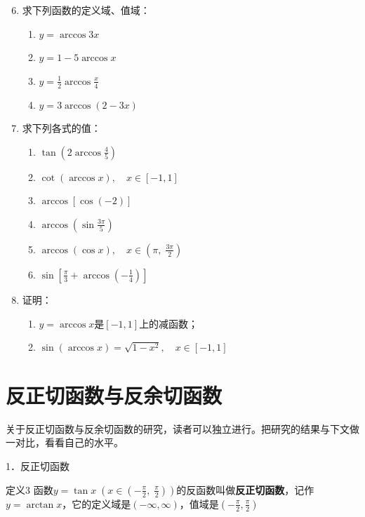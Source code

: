 \begin{enumerate}\setcounter{enumi}{5}
    \item 求下列函数的定义域、值域：
\begin{multicols}{2}
\begin{enumerate}[(1)]
    \item $y=\arccos 3x$
    \item $y=1-5\arccos x$
    \item $y=\frac{1}{2}\arccos\frac{x}{4}$
    \item $y=3\arccos (2-3x)$
\end{enumerate}
\end{multicols}

\item 求下列各式的值：
\begin{multicols}{2}
\begin{enumerate}[(1)]
    \item $\tan\left(2\arccos\frac{4}{5}\right)$
    \item $\cot(\arccos x),\quad x\in[-1,1]$
    \item $\arccos[\cos(-2)]$
    \item $\arccos\left(\sin\frac{3\pi}{5}\right)$
    \item $\arccos(\cos x),\quad x\in\left(\pi,\; \frac{3\pi}{2}\right)$
    \item $\sin\left[\frac{\pi}{3}+\arccos\left(-\frac{1}{4}\right)\right]$
\end{enumerate}
\end{multicols}

\item 证明：
\begin{enumerate}[(1)]
    \item $y=\arccos x$是$[-1,1]$上的减函数；
    \item $\sin(\arccos x)=\sqrt{1-x^2},\quad x\in[-1,1]$
\end{enumerate}
\end{enumerate}

\section{反正切函数与反余切函数}
关于反正切函数与反余切函数的研究，读者可以独立进行。把研究的结果与下文做一对比，看看自己的水平。

1．反正切函数

\begin{thm}
 {定义3} 函数$y=\tan x\; \left(x\in \left(-\frac{\pi}{2},\; \frac{\pi}{2}\right) \right)$的反函数叫做\textbf{反正切函数}，记作$y=\arctan x$，它的定义域是$(-\infty,\infty)$，值域是$\left(-\frac{\pi}{2},\frac{\pi}{2}\right)$
\end{thm}

